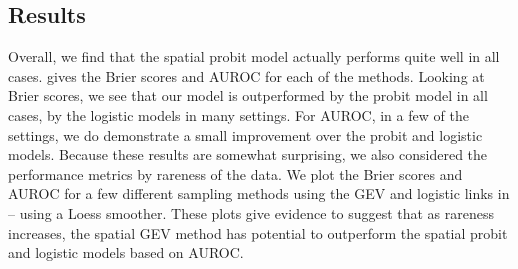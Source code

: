 \subsection{Results} \label{rbs:simresults}
Overall, we find that the spatial probit model actually performs quite well in all cases.
 gives the Brier scores and AUROC for each of the methods.
Looking at Brier scores, we see that our model is outperformed by the probit model in all cases, by the logistic models in many settings.
For AUROC, in a few of the settings, we do demonstrate a small improvement over the probit and logistic models.
Because these results are somewhat surprising, we also considered the performance metrics by rareness of the data.
We plot the Brier scores and AUROC for a few different sampling methods using the GEV and logistic links in  --  using a Loess smoother.
These plots give evidence to suggest that as rareness increases, the spatial GEV method has potential to outperform the spatial probit and logistic models based on AUROC.

